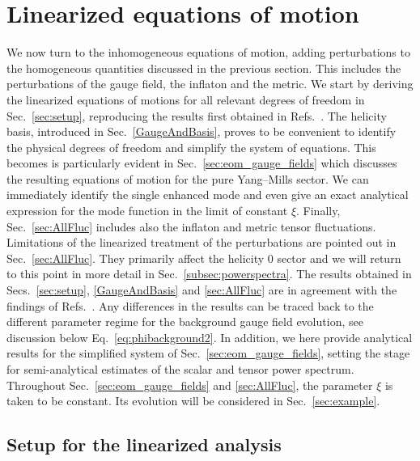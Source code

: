 

\section{Linearized equations of motion \label{sec:linearized}}

We now turn to the inhomogeneous equations of motion, adding perturbations to the homogeneous quantities discussed in the previous section.  This includes the perturbations of the gauge field, the inflaton and the metric. We start by deriving the linearized equations of motions for all relevant degrees of freedom in Sec.~\ref{sec:setup}, reproducing the results first obtained in Refs.~\cite{Dimastrogiovanni:2012ew,Adshead:2013qp}. The helicity basis, introduced in Sec.~\ref{GaugeAndBasis}, proves to be convenient to identify the physical degrees of freedom and simplify the system of equations. This becomes is particularly evident in Sec.~\ref{sec:eom_gauge_fields} which discusses the resulting equations of motion for the pure Yang--Mills sector. We can immediately identify the single enhanced mode and even give an exact analytical expression for the mode function in the limit of constant $\xi$. Finally, Sec.~\ref{sec:AllFluc} includes also the inflaton and metric tensor fluctuations. {Limitations of the linearized treatment of the perturbations are pointed out in Sec.~\ref{sec:AllFluc}. They primarily affect the helicity 0 sector and we will return to this point in more detail in Sec.~\ref{subsec:powerspectra}.} The results obtained in Secs.~\ref{sec:setup}, \ref{GaugeAndBasis} and \ref{sec:AllFluc} are in agreement with the findings of Refs.~\cite{Dimastrogiovanni:2012ew,Adshead:2013nka,Adshead:2013qp,Namba:2013kia}. Any differences in the results can be traced back to the different parameter regime for the background gauge field evolution, see discussion below Eq.~\eqref{eq:phibackground2}. In addition, we here provide analytical results for the simplified system of Sec.~\ref{sec:eom_gauge_fields}, setting the stage for semi-analytical estimates of the scalar and tensor power spectrum.  Throughout Sec.~\ref{sec:eom_gauge_fields} and \ref{sec:AllFluc}, the parameter $\xi$ is taken to be constant. Its evolution will be considered in Sec.~\ref{sec:example}.



\subsection{Setup for the linearized analysis \label{sec:setup}}

